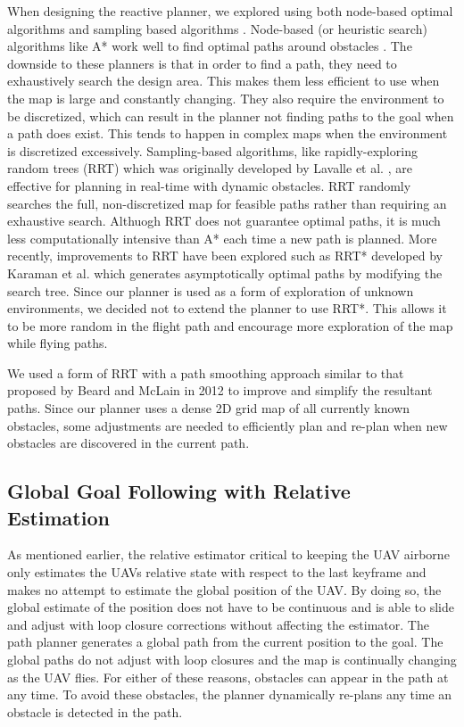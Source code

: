 \documentclass[letterpaper, 10 pt, conference]{ieeeconf}  %
\begin{document}
When designing the reactive planner, we explored using both node-based optimal algorithms and sampling based algorithms \cite{Yang2016}. Node-based (or heuristic search) algorithms like A* work well to find optimal paths around obstacles \cite{Nilsson2011}. The downside to these planners is that in order to find a path, they need to exhaustively search the design area. This makes them less efficient to use when the map is large and constantly changing. They also require the environment to be discretized, which can result in the planner not finding paths to the goal when a path does exist. This tends to happen in complex maps when the environment is discretized excessively. Sampling-based algorithms, like rapidly-exploring random trees (RRT) which was originally developed by Lavalle et al. \cite{Lavalle1998}, are effective for planning in real-time with dynamic obstacles. RRT randomly searches the full, non-discretized map for feasible paths rather than requiring an exhaustive search. Althuogh RRT does not guarantee optimal paths, it is much less computationally intensive than A* each time a new path is planned. More recently, improvements to RRT have been explored such as RRT* developed by Karaman et al. \cite{Karaman2011} which generates asymptotically optimal paths by modifying the search tree. Since our planner is used as a form of exploration of unknown environments, we decided not to extend the planner to use RRT*. This allows it to be more random in the flight path and encourage more exploration of the map while flying paths.

We used a form of RRT with a path smoothing approach similar to that proposed by Beard and McLain in 2012 \cite{Beard2012} to improve and simplify the resultant paths. Since our planner uses a dense 2D grid map of all currently known obstacles, some adjustments are needed to efficiently plan and re-plan when new obstacles are discovered in the current path.

\subsection{Global Goal Following with Relative Estimation}

As mentioned earlier, the relative estimator critical to keeping the UAV airborne only estimates the UAVs relative state with respect to the last keyframe and makes no attempt to estimate the global position of the UAV. By doing so, the global estimate of the position does not have to be continuous and is able to slide and adjust with loop closure corrections without affecting the estimator. The path planner generates a global path from the current position to the goal. The global paths do not adjust with loop closures and the map is continually changing as the UAV flies. For either of these reasons, obstacles can appear in the path at any time. To avoid these obstacles, the planner dynamically re-plans any time an obstacle is detected in the path.
\end{document}
